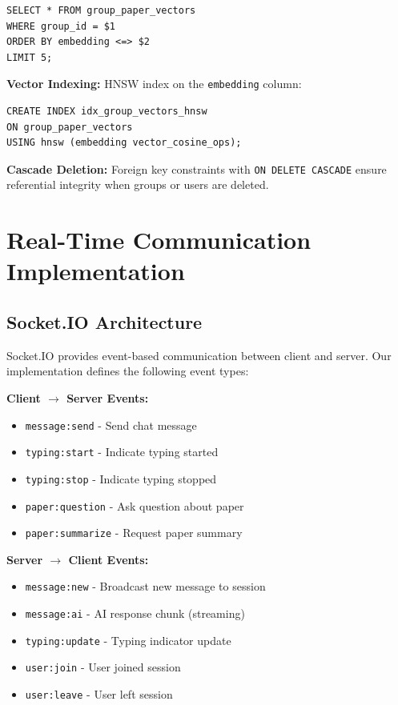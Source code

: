 \documentclass[12pt]{report}
\begin{document}
\begin{verbatim}
SELECT * FROM group_paper_vectors 
WHERE group_id = $1 
ORDER BY embedding <=> $2 
LIMIT 5;
\end{verbatim}

\textbf{Vector Indexing:} HNSW index on the \texttt{embedding} column:

\begin{verbatim}
CREATE INDEX idx_group_vectors_hnsw 
ON group_paper_vectors 
USING hnsw (embedding vector_cosine_ops);
\end{verbatim}

\textbf{Cascade Deletion:} Foreign key constraints with \texttt{ON DELETE CASCADE} ensure referential integrity when groups or users are deleted.

\section{Real-Time Communication Implementation}

\subsection{Socket.IO Architecture}

Socket.IO provides event-based communication between client and server. Our implementation defines the following event types:

\textbf{Client $\rightarrow$ Server Events:}
\begin{itemize}
    \item \texttt{message:send} - Send chat message
    \item \texttt{typing:start} - Indicate typing started
    \item \texttt{typing:stop} - Indicate typing stopped
    \item \texttt{paper:question} - Ask question about paper
    \item \texttt{paper:summarize} - Request paper summary
\end{itemize}

\textbf{Server $\rightarrow$ Client Events:}
\begin{itemize}
    \item \texttt{message:new} - Broadcast new message to session
    \item \texttt{message:ai} - AI response chunk (streaming)
    \item \texttt{typing:update} - Typing indicator update
    \item \texttt{user:join} - User joined session
    \item \texttt{user:leave} - User left session
\end{itemize}
\end{document}
